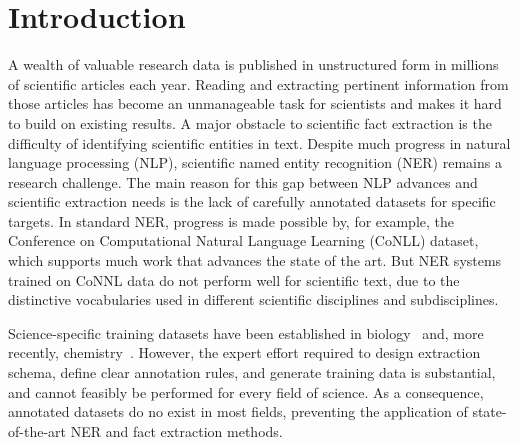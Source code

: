 \section{Introduction}
\label{sect:apner_introduction}
A wealth of valuable research data is published in unstructured form in millions of scientific articles each year.%
Reading and extracting pertinent information from those articles has
become an unmanageable task for scientists and makes
it hard to build on existing results. 
A major obstacle to scientific fact extraction is the difficulty of identifying scientific entities in text.
Despite much progress in natural language processing (NLP), 
scientific named entity recognition (NER) remains a research challenge.
The main reason for this gap between NLP advances and scientific extraction needs is the lack of carefully annotated datasets for specific targets.
In standard NER, 
progress is made possible by, for example, the 
Conference on Computational Natural Language Learning (CoNLL) dataset,
which supports much work that advances the state of the art.
But NER systems trained on CoNNL data do not perform well for scientific text, due to 
the distinctive vocabularies used in different scientific disciplines and subdisciplines.

Science-specific training datasets have been established in
biology~\cite{song2004posbiotm} and, more recently, chemistry~\cite{krallinger2015chemdner}.
However, the expert effort required to 
design 
extraction schema, 
define clear annotation rules, and generate training data %
is substantial, and cannot feasibly be performed for 
every field of science.
As a consequence, annotated datasets do no exist in most fields,
preventing the application of state-of-the-art NER and fact extraction methods.

